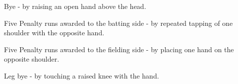 \documentclass[12pt]{article}
\begin{document}
\vspace{\baselineskip}
\begin{adjustwidth}{1.0in}{0.0in}
{\fontsize{9pt}{10.8pt}\selectfont Bye - by raising an open hand above the head.\par}\par

\end{adjustwidth}


\vspace{\baselineskip}
\begin{adjustwidth}{1.0in}{0.42in}
{\fontsize{9pt}{10.8pt}\selectfont Five Penalty runs awarded to the batting side - by repeated tapping of one shoulder with the opposite hand.\par}\par

\end{adjustwidth}


\vspace{\baselineskip}
\begin{adjustwidth}{1.0in}{0.0in}
{\fontsize{9pt}{10.8pt}\selectfont Five Penalty runs awarded to the fielding side - by placing one hand on the opposite shoulder.\par}\par

\end{adjustwidth}


\vspace{\baselineskip}

\vspace{\baselineskip}

\vspace{\baselineskip}

\vspace{\baselineskip}
\begin{adjustwidth}{0.0in}{-0.01in}
\begin{Center}
{\fontsize{8pt}{9.6pt}\par}
\end{Center}\par

\end{adjustwidth}


\vspace{\baselineskip}
\begin{adjustwidth}{1.0in}{0.0in}
{\fontsize{9pt}{10.8pt}\selectfont Leg bye - by touching a raised knee with the hand.\par}\par

\end{adjustwidth}
\end{document}
